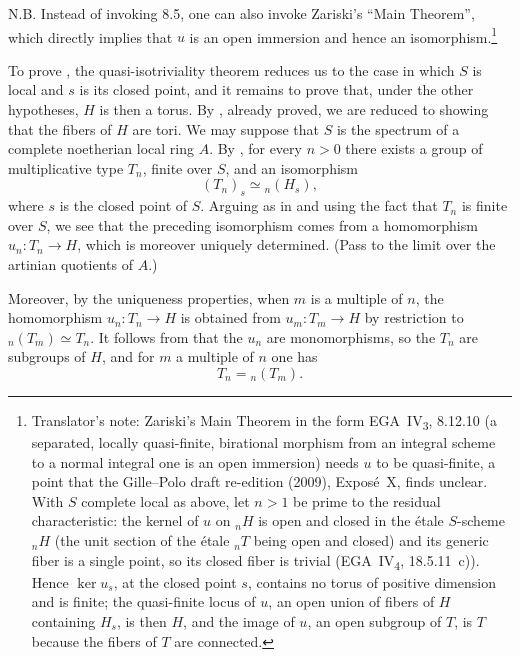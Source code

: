 N.B. Instead of invoking 8.5, one can also invoke Zariski's ``Main
Theorem'', which directly implies that \(u\) is an open immersion and hence
an isomorphism.\footnote{Translator's note: Zariski's Main Theorem in the
form EGA~IV\textsubscript{3}, 8.12.10 (a separated, locally quasi-finite,
birational morphism from an integral scheme to a normal integral one is an
open immersion) needs \(u\) to be quasi-finite, a point that
the Gille--Polo draft re-edition (2009), Exposé~X, finds unclear. With \(S\) complete local as above, let
\(n>1\) be prime to the residual characteristic: the kernel of \(u\) on
\({}_nH\) is open and closed in the étale \(S\)-scheme \({}_nH\) (the unit
section of the étale \({}_nT\) being open and closed) and its generic fiber
is a single point, so its closed fiber is trivial
(EGA~IV\textsubscript{4}, 18.5.11~c)). Hence \(\ker u_s\), at the closed
point \(s\), contains no torus of positive dimension and is finite; the
quasi-finite locus of \(u\), an open union of fibers of \(H\) containing
\(H_s\), is then \(H\), and the image of \(u\), an open subgroup of \(T\),
is \(T\) because the fibers of \(T\) are connected.}

To prove , the quasi-isotriviality theorem reduces us to the case in
which \(S\) is local and \(s\) is its closed
point, and it
remains to prove that, under the other hypotheses, \(H\) is then a torus.
By , already proved, we are reduced to showing that the fibers of \(H\)
are tori. We may suppose that \(S\) is the spectrum of a complete
noetherian local ring \(A\). By , for every \(n>0\) there exists a
group of multiplicative type \(T_n\), finite over \(S\), and an
isomorphism
\[
  (T_n)_s\simeq {}_n(H_s),
\]
where \(s\) is the closed point of \(S\). Arguing as in  and using the
fact that \(T_n\) is finite over
\(S\), we see that
the preceding isomorphism comes from a homomorphism
\(u_n:T_n\to H\), which is moreover uniquely determined. (Pass to the
limit over the artinian quotients of \(A\).)

Moreover, by the uniqueness properties, when \(m\) is a multiple of \(n\),
the homomorphism \(u_n:T_n\to H\) is obtained from
\(u_m:T_m\to H\) by restriction to
\({}_n(T_m)\simeq T_n\). It follows from  that the \(u_n\) are
monomorphisms, so the \(T_n\) are subgroups of \(H\), and for \(m\) a
multiple of \(n\) one has
\[
  T_n={}_n(T_m).
\]

